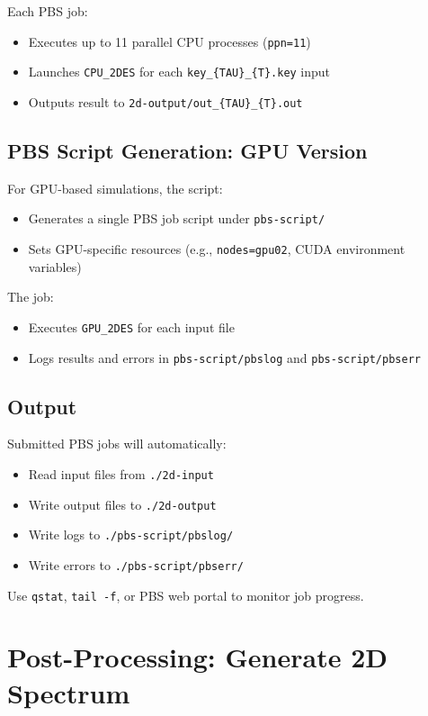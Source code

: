 \documentclass{article}
\begin{document}
Each PBS job:
\begin{itemize}
    \item Executes up to 11 parallel CPU processes (\texttt{ppn=11})
    \item Launches \texttt{CPU\_2DES} for each \texttt{key\_\{TAU\}\_\{T\}.key} input
    \item Outputs result to \texttt{2d-output/out\_\{TAU\}\_\{T\}.out}
\end{itemize}

\subsection*{PBS Script Generation: GPU Version}

For GPU-based simulations, the script:
\begin{itemize}
    \item Generates a single PBS job script under \texttt{pbs-script/}
    \item Sets GPU-specific resources (e.g., \texttt{nodes=gpu02}, CUDA environment variables)
\end{itemize}

The job:
\begin{itemize}
    \item Executes \texttt{GPU\_2DES} for each input file
    \item Logs results and errors in \texttt{pbs-script/pbslog} and \texttt{pbs-script/pbserr}
\end{itemize}

\subsection*{Output}

Submitted PBS jobs will automatically:
\begin{itemize}
    \item Read input files from \texttt{./2d-input}
    \item Write output files to \texttt{./2d-output}
    \item Write logs to \texttt{./pbs-script/pbslog/}
    \item Write errors to \texttt{./pbs-script/pbserr/}
\end{itemize}

Use \texttt{qstat}, \texttt{tail -f}, or PBS web portal to monitor job progress.

\section{Post-Processing: Generate 2D Spectrum}
\end{document}
